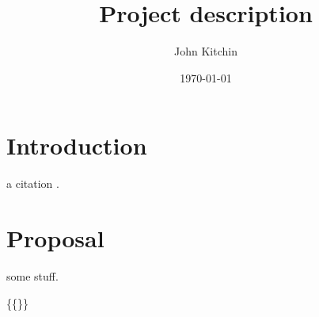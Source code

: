 \documentclass[12pt]{article}
\author{John Kitchin}
\date{\today}
\title{Project description}
\begin{document}
\section{Introduction}
\label{sec-1}
a citation \cite{mehta-2014-ident-poten}.

\section{Proposal}
\label{sec-2}
some stuff.

\newpage


\{\vbox\{\}\}



\end{document}
